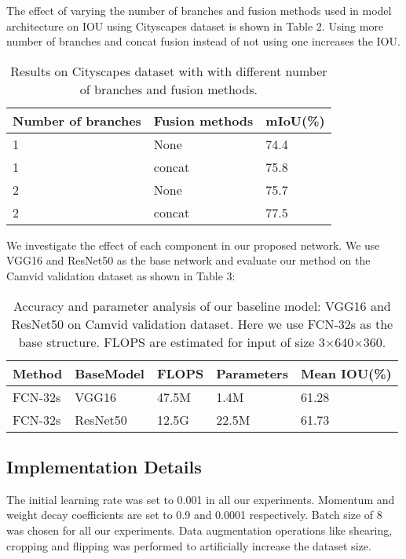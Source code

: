 \documentclass{article}
\begin{document}
The effect of varying the number of branches and fusion methods used in model architecture on IOU using Cityscapes dataset is shown in Table 2. Using more number of branches and concat fusion instead of not using one increases the IOU. 

\begin{table}[h]
  \caption{Results on Cityscapes dataset with with different number of branches and fusion methods.}
  \label{sample-table3}
  \centering
  \begin{tabular}{lll}
  \toprule
    Number of branches &Fusion methods &mIoU(\%)\\
   \midrule
1 &None &74.4\\
1 &concat &75.8\\
2 &None &75.7\\
2 &concat &77.5\\
    \bottomrule
  \end{tabular}
\end{table}

We investigate the effect of each component in
our proposed network. We use VGG16 and ResNet50 as the base network and evaluate our method on the Camvid validation
dataset as shown in Table 3:

\begin{table}[h]
  \caption{Accuracy and parameter analysis of our baseline model: VGG16 and ResNet50 on Camvid validation dataset. Here we use FCN-32s as the base structure.
FLOPS are estimated for input of size 3$\times$640$\times$360.}
  \label{sample-table7}
  \centering
  \begin{tabular}{lllll}
  \toprule
    Method &BaseModel &FLOPS &Parameters &Mean IOU(\%)\\
   \midrule
FCN-32s &VGG16 &47.5M &1.4M &61.28\\
FCN-32s &ResNet50 &12.5G &22.5M &61.73\\
    \bottomrule
  \end{tabular}
\end{table}

\subsection{Implementation Details}

The initial learning rate was set to 0.001 in all our experiments. Momentum and weight decay coefficients are set to 0.9 and 0.0001 respectively. Batch size of 8 was chosen for all our experiments. Data augmentation operations like shearing, cropping and flipping was performed to artificially increase the dataset size.
\end{document}
